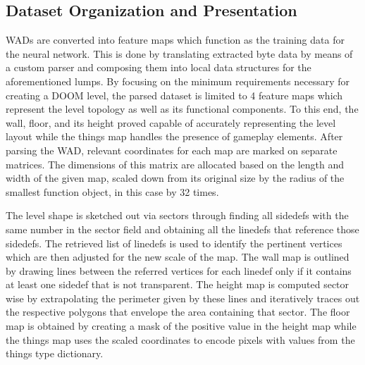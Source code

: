 \documentclass{Configuration_Files/PoliMi3i_thesis}
\begin{document}
\subsection{Dataset Organization and Presentation}
WADs are converted into feature maps which function as the training data for the 
neural network. This is done by translating extracted byte data by means of a custom 
parser and composing them into local data structures for the aforementioned lumps. 
By focusing on the minimum requirements necessary for creating a DOOM level, the 
parsed dataset is limited to 4 feature maps which represent the level topology as well 
as its functional components. To this end, the wall, floor, and its height proved
capable of accurately representing the level layout while the things map handles the 
presence of gameplay elements. After parsing the WAD, relevant coordinates
for each map are marked on separate matrices. The dimensions of this matrix are 
allocated based on the length and width of the given map, scaled down from its 
original size by the radius of the smallest function object, in this case by 32 times. 

The level shape is sketched out via sectors through finding all sidedefs with the same
number in the sector field and obtaining all the linedefs that reference those sidedefs. 
The retrieved list of linedefs is used to identify the pertinent vertices which are then 
adjusted for the new scale of the map. The wall map is outlined by drawing lines 
between the referred vertices for each linedef only if it contains at least one sidedef 
that is not transparent. The height map is computed sector wise by extrapolating the 
perimeter given by these lines and iteratively traces out the respective polygons that 
envelope the area containing that sector. The floor map is obtained by creating a 
mask of the positive value in the height map while the things map uses the scaled 
coordinates to encode pixels with values from the things type dictionary. 
\end{document}

